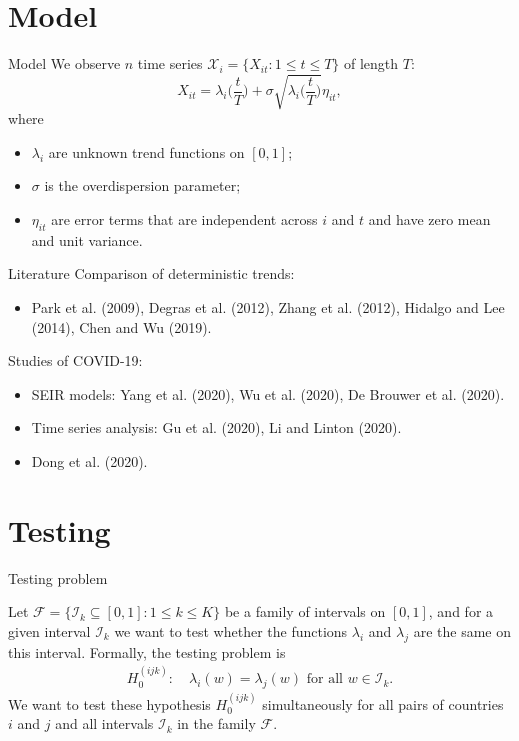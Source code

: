 \documentclass[10pt]{beamer}
\begin{document}
\section{Model}
\begin{frame}{Model}
We observe $n$ time series $\mathcal{X}_i = \{X_{it}: 1 \le t \le T \}$ of length $T$:
\begin{equation*}
X_{it} = \lambda_i \Big( \frac{t}{T} \Big) + \sigma\sqrt{\lambda_i \Big( \frac{t}{T} \Big)} \eta_{it},
\end{equation*}\pause
\vspace{-3mm}
where
\begin{itemize}
\item $\lambda_i$ are unknown trend functions on $[0,1]$;
\item $\sigma$ is the overdispersion parameter;
\item $\eta_{it}$ are error terms that are independent across $i$ and $t$ and have zero mean and unit variance.
\end{itemize}
\end{frame}

\begin{frame}{Literature}
	Comparison of deterministic trends:
	\begin{itemize}
		\item Park et al. (2009), Degras et al. (2012), Zhang et al. (2012), Hidalgo and Lee (2014), Chen and Wu (2019).
	\end{itemize}\pause
	Studies of COVID-19:
	\begin{itemize}
		\item SEIR models: Yang et al. (2020), Wu et al. (2020), De Brouwer et al. (2020).
		\item Time series analysis: Gu et al. (2020), Li and Linton (2020).
		\item Dong et al. (2020).
	\end{itemize}
\end{frame}

\section{Testing}
\begin{frame}{Testing problem}

Let $\mathcal{F} =\{ \mathcal{I}_k \subseteq [0, 1]: 1 \le k \le K\}$ be a family of intervals on $[0, 1]$, and for a given interval $\mathcal{I}_k$ we want to test whether the functions $\lambda_i$ and $\lambda_j$ are the same on this interval. Formally, the testing problem is
\begin{align*}
H_0^{(ijk)}:\quad  \lambda_i(w) = \lambda_j(w) \text{ for all } w\in \mathcal{I}_k.
\end{align*}\pause
We want to test these hypothesis $H_0^{(ijk)}$ simultaneously for all pairs of countries $i$ and $j$ and all intervals $\mathcal{I}_k$ in the family $\mathcal{F}$.
\end{frame} 
\end{document}
